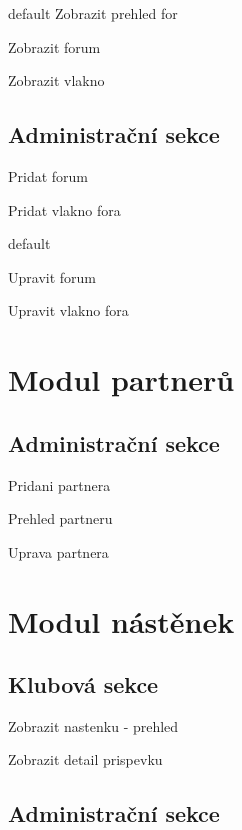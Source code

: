 \documentclass[11pt,oneside]{fithesis}
\begin{document}
            default Zobrazit prehled for

            Zobrazit forum

            Zobrazit vlakno



            \subsection*{Administrační sekce}

            Pridat forum

            Pridat vlakno fora

            default

            Upravit forum

            Upravit vlakno fora



        \section{Modul partnerů}



            \subsection*{Administrační sekce}

            Pridani partnera

            Prehled partneru

            Uprava partnera



        \section{Modul nástěnek}



            \subsection*{Klubová sekce}

            Zobrazit nastenku - prehled

            Zobrazit detail prispevku



            \subsection*{Administrační sekce}
\end{document}
